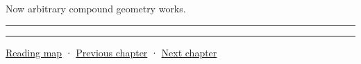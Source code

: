 Now arbitrary compound geometry works.

\begin{center}\rule{0.5\linewidth}{0.5pt}\end{center}

\begin{center}\rule{0.5\linewidth}{0.5pt}\end{center}

\hyperref[volume-reading-map]{Reading map} · \hyperref[06-engine-ii-ch034-rigid-body-motion-from-forces-to-contact]{Previous chapter} · \hyperref[06-engine-ii-ch036-auditing-capsule-mass-properties-and-collision-formulas]{Next chapter}
